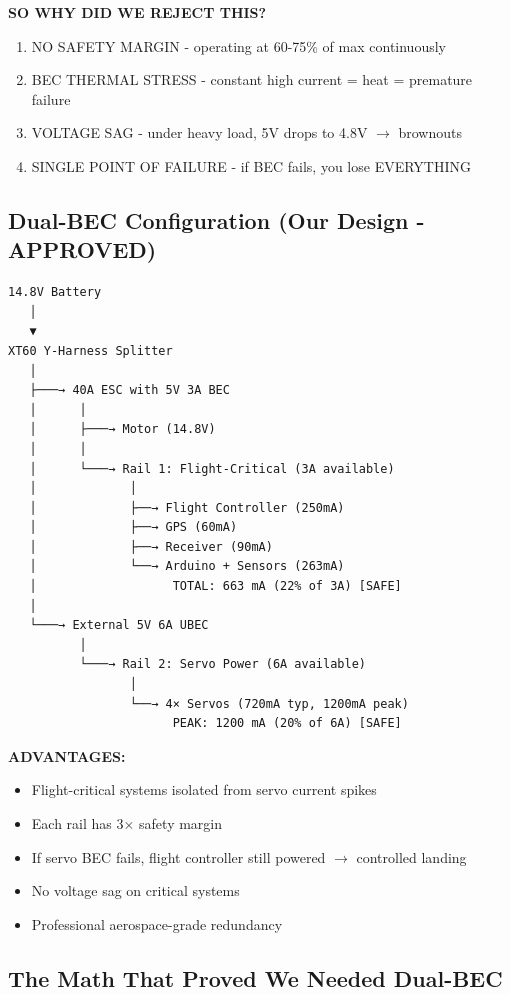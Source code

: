 \documentclass[11pt,letterpaper]{article}
\begin{document}
\textbf{SO WHY DID WE REJECT THIS?}
\begin{enumerate}
  \item NO SAFETY MARGIN - operating at 60-75\% of max continuously
  \item BEC THERMAL STRESS - constant high current = heat = premature failure
  \item VOLTAGE SAG - under heavy load, 5V drops to 4.8V $\rightarrow$ brownouts
  \item SINGLE POINT OF FAILURE - if BEC fails, you lose EVERYTHING
\end{enumerate}

\subsection{Dual-BEC Configuration (Our Design - APPROVED)}

\begin{verbatim}
14.8V Battery
   │
   ▼
XT60 Y-Harness Splitter
   │
   ├───→ 40A ESC with 5V 3A BEC
   │      │
   │      ├───→ Motor (14.8V)
   │      │
   │      └───→ Rail 1: Flight-Critical (3A available)
   │             │
   │             ├──→ Flight Controller (250mA)
   │             ├──→ GPS (60mA)
   │             ├──→ Receiver (90mA)
   │             └──→ Arduino + Sensors (263mA)
   │                   TOTAL: 663 mA (22% of 3A) [SAFE]
   │
   └───→ External 5V 6A UBEC
          │
          └───→ Rail 2: Servo Power (6A available)
                 │
                 └──→ 4× Servos (720mA typ, 1200mA peak)
                       PEAK: 1200 mA (20% of 6A) [SAFE]
\end{verbatim}

\textbf{ADVANTAGES:}
\begin{itemize}
  \item[OK] Flight-critical systems isolated from servo current spikes
  \item[OK] Each rail has 3$\times$ safety margin
  \item[OK] If servo BEC fails, flight controller still powered $\rightarrow$ controlled landing
  \item[OK] No voltage sag on critical systems
  \item[OK] Professional aerospace-grade redundancy
\end{itemize}

\subsection{The Math That Proved We Needed Dual-BEC}
\end{document}
